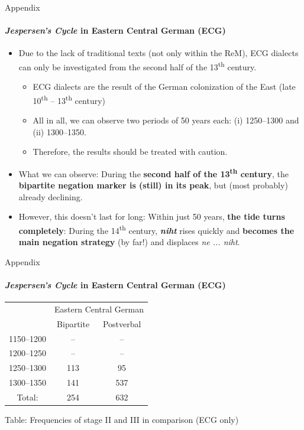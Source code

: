\documentclass[xcolor=table, compress, %
handout
]{beamer}
\begin{document}
\begin{frame}{Appendix}
\framesubtitle{\textit{Jespersen's Cycle} in Eastern Central German (ECG)}

\begin{itemize}
    \item Due to the lack of traditional texts (not only within the ReM), ECG dialects can only be investigated from the second half of the 13\textsuperscript{th} century.
    \begin{itemize}
    \item ECG dialects are the result of the German colonization of the East (late 10\textsuperscript{th} – 13\textsuperscript{th} century)
    \item All in all, we can observe two periods of 50 years each: (i) 1250–1300 and (ii) 1300–1350.
    \item Therefore, the results should be treated with caution.
\end{itemize}
    \item What we can observe: During the \textbf{second half of the 13\textsuperscript{th} century}, the \textbf{bipartite negation marker is (still) in its peak}, but (most probably) already declining.
    \item However, this doesn't last for long: Within just 50 years, \textbf{the tide turns completely}: During the 14\textsuperscript{th} century, \textbf{\textit{niht}} rises quickly and \textbf{becomes the main negation strategy} (by far!) and displaces \textit{ne ... niht}.
    \end{itemize}

\end{frame}

\begin{frame}{Appendix}
\framesubtitle{\textit{Jespersen's Cycle} in Eastern Central German (ECG)}

\begin{center}
\begin{tabular}{c | c c}
\hline\hline
 & \multicolumn{2}{c}{Eastern Central German} \\
 & Bipartite & Postverbal\\
\hline
1150–1200 & – & –\\
1200–1250 & – & –\\
\alert{1250–1300} & \alert{113} & \alert{95}\\
\alert{1300–1350} & \alert{141} & \alert{537}\\
\hline
Total: & 254 & 632\\
\hline\hline
\end{tabular}
\end{center}
\begin{center}
Table: Frequencies of stage II and III in comparison (ECG only)
\end{center}

\end{frame}
\end{document}
